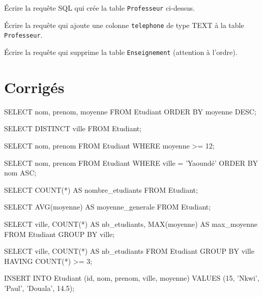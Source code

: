 \exo{}
Écrire la requête SQL qui crée la table \texttt{Professeur} ci-dessus.

\exo{}
Écrire la requête qui ajoute une colonne \texttt{telephone} de type TEXT à la table \texttt{Professeur}.

\exo{}
Écrire la requête qui supprime la table \texttt{Enseignement} (attention à l'ordre).

\section{Corrigés}

\begin{sqlcode}
SELECT nom, prenom, moyenne
FROM Etudiant
ORDER BY moyenne DESC;
\end{sqlcode}

\begin{sqlcode}
SELECT DISTINCT ville
FROM Etudiant;
\end{sqlcode}

\begin{sqlcode}
SELECT nom, prenom
FROM Etudiant
WHERE moyenne >= 12;
\end{sqlcode}

\begin{sqlcode}
SELECT nom, prenom
FROM Etudiant
WHERE ville = 'Yaoundé'
ORDER BY nom ASC;
\end{sqlcode}

\begin{sqlcode}
SELECT COUNT(*) AS nombre_etudiants
FROM Etudiant;
\end{sqlcode}

\begin{sqlcode}
SELECT AVG(moyenne) AS moyenne_generale
FROM Etudiant;
\end{sqlcode}

\begin{sqlcode}
SELECT ville, COUNT(*) AS nb_etudiants, MAX(moyenne) AS max_moyenne
FROM Etudiant
GROUP BY ville;
\end{sqlcode}

\begin{sqlcode}
SELECT ville, COUNT(*) AS nb_etudiants
FROM Etudiant
GROUP BY ville
HAVING COUNT(*) >= 3;
\end{sqlcode}

\begin{sqlcode}
INSERT INTO Etudiant (id, nom, prenom, ville, moyenne)
VALUES (15, 'Nkwi', 'Paul', 'Douala', 14.5);
\end{sqlcode}

